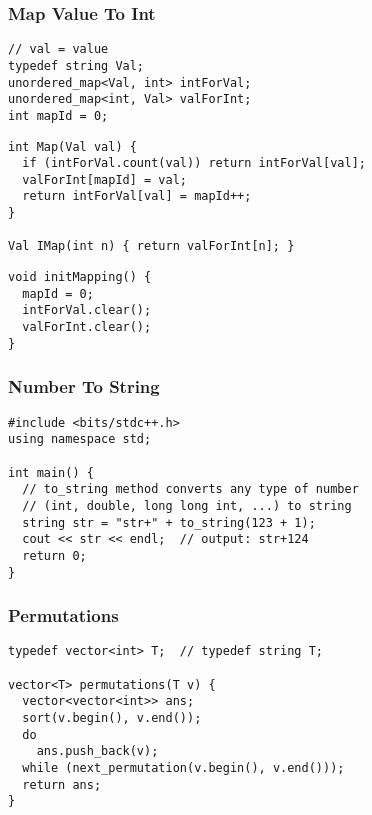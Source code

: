 \documentclass[twoside]{article}
\begin{document}
\begin{multicols*}{2}
\subsubsection*{Map Value To Int}
\begin{verbatim}
// val = value
typedef string Val;
unordered_map<Val, int> intForVal;
unordered_map<int, Val> valForInt;
int mapId = 0;
\end{verbatim}
\vspace{-12pt}
\begin{verbatim}
int Map(Val val) {
  if (intForVal.count(val)) return intForVal[val];
  valForInt[mapId] = val;
  return intForVal[val] = mapId++;
}

Val IMap(int n) { return valForInt[n]; }
\end{verbatim}
\vspace{-12pt}
\begin{verbatim}
void initMapping() {
  mapId = 0;
  intForVal.clear();
  valForInt.clear();
}
\end{verbatim}

\subsubsectionfont{\large\bfseries\sffamily\underline}
\subsubsection*{Number To String}
\begin{verbatim}
#include <bits/stdc++.h>
using namespace std;

int main() {
  // to_string method converts any type of number
  // (int, double, long long int, ...) to string
  string str = "str+" + to_string(123 + 1);
  cout << str << endl;  // output: str+124
  return 0;
}
\end{verbatim}

\subsubsectionfont{\large\bfseries\sffamily\underline}
\subsubsection*{Permutations}
\begin{verbatim}
typedef vector<int> T;  // typedef string T;

vector<T> permutations(T v) {
  vector<vector<int>> ans;
  sort(v.begin(), v.end());
  do
    ans.push_back(v);
  while (next_permutation(v.begin(), v.end()));
  return ans;
}
\end{verbatim}


\end{multicols*}
\end{document}
